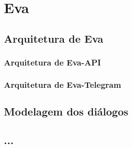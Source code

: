 \chapter{Eva}


\section{Arquitetura de Eva}


\subsection{Arquitetura de Eva-API}

\subsection{Arquitetura de Eva-Telegram}


\section{Modelagem dos diálogos}


\section{...}
